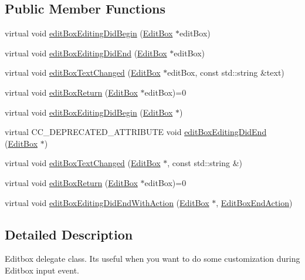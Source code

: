 \subsection*{Public Member Functions}
\begin{DoxyCompactItemize}
\item 
virtual void \hyperlink{classui_1_1EditBoxDelegate_aad37c3eef84de98c9bf5611b17a223b5}{edit\+Box\+Editing\+Did\+Begin} (\hyperlink{classui_1_1EditBox}{Edit\+Box} $\ast$edit\+Box)
\item 
virtual void \hyperlink{classui_1_1EditBoxDelegate_acbd33fc4e40fabb6e7b9ed925b273bbe}{edit\+Box\+Editing\+Did\+End} (\hyperlink{classui_1_1EditBox}{Edit\+Box} $\ast$edit\+Box)
\item 
virtual void \hyperlink{classui_1_1EditBoxDelegate_af58ec2338b2250abcb129c584ba424fb}{edit\+Box\+Text\+Changed} (\hyperlink{classui_1_1EditBox}{Edit\+Box} $\ast$edit\+Box, const std\+::string \&text)
\item 
virtual void \hyperlink{classui_1_1EditBoxDelegate_acf0e70504509694fb0b73b5e517669c6}{edit\+Box\+Return} (\hyperlink{classui_1_1EditBox}{Edit\+Box} $\ast$edit\+Box)=0
\item 
virtual void \hyperlink{classui_1_1EditBoxDelegate_ad1d1f9d071792d418f48b1ad64527f4d}{edit\+Box\+Editing\+Did\+Begin} (\hyperlink{classui_1_1EditBox}{Edit\+Box} $\ast$)
\item 
virtual C\+C\+\_\+\+D\+E\+P\+R\+E\+C\+A\+T\+E\+D\+\_\+\+A\+T\+T\+R\+I\+B\+U\+TE void \hyperlink{classui_1_1EditBoxDelegate_a0703fe7737a945f4791c53be7dcffa1e}{edit\+Box\+Editing\+Did\+End} (\hyperlink{classui_1_1EditBox}{Edit\+Box} $\ast$)
\item 
virtual void \hyperlink{classui_1_1EditBoxDelegate_ac98e63e402ea39fc74cfb0dd33a132ab}{edit\+Box\+Text\+Changed} (\hyperlink{classui_1_1EditBox}{Edit\+Box} $\ast$, const std\+::string \&)
\item 
virtual void \hyperlink{classui_1_1EditBoxDelegate_acf0e70504509694fb0b73b5e517669c6}{edit\+Box\+Return} (\hyperlink{classui_1_1EditBox}{Edit\+Box} $\ast$edit\+Box)=0
\item 
virtual void \hyperlink{classui_1_1EditBoxDelegate_a61ed8e1dccf66b4734f36e18e3bb14be}{edit\+Box\+Editing\+Did\+End\+With\+Action} (\hyperlink{classui_1_1EditBox}{Edit\+Box} $\ast$, \hyperlink{classui_1_1EditBoxDelegate_ae7285a0cdbe2f2daf0557c97dba0bdb5}{Edit\+Box\+End\+Action})
\end{DoxyCompactItemize}


\subsection{Detailed Description}
Editbox delegate class. It\textquotesingle{}s useful when you want to do some customization during Editbox input event. 

